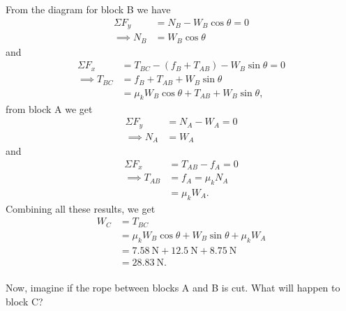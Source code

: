 \documentclass[../classical_mechanics.tex]{subfiles}
\begin{document}
\begin{example}
            From the diagram for block B we have
            \begin{align}
                \Sigma F_y&=N_B-W_B\cos\theta=0\\
                \implies N_B&=W_B\cos\theta
            \end{align}
            and
            \begin{align}
                \Sigma F_x&=T_{BC}-(f_B+T_{AB})-W_B\sin\theta=0\\
                \implies T_{BC}&=f_B+T_{AB}+W_B\sin\theta\\
                &=\mu_k W_B\cos\theta+T_{AB}+W_B\sin\theta,
            \end{align}
            from block A we get
            \begin{align}
                \Sigma F_y&=N_A-W_A=0\\
                \implies N_A&=W_A
            \end{align}
            and
            \begin{align}
                \Sigma F_x&=T_{AB}-f_A=0\\
                \implies T_{AB}&=f_A=\mu_k N_A\\
                &=\mu_k W_A.
            \end{align}
            Combining all these results, we get
            \begin{align}
                W_C&=T_{BC}\\
                &=\mu_k W_B\cos\theta+W_B\sin\theta+\mu_k W_A\\
                &=\qty{7.58}{\newton}+\qty{12.5}{\newton}+\qty{8.75}{\newton}\\
                &=\qty{28.83}{\newton}.
            \end{align}

            \paragraph{}
            Now, imagine if the rope between blocks A and B is cut.
            What will happen to block C?


\end{example}
\end{document}
